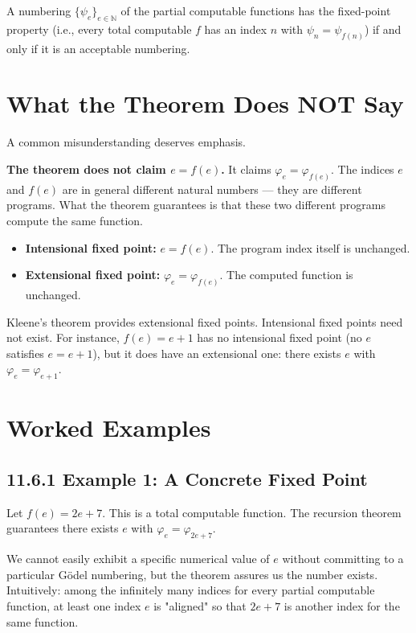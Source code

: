 \begin{theorem}
A numbering $\{ \psi_e\} _{e \in \mathbb{N}}$ of the partial computable functions has the fixed-point property (i.e., every total computable $f$ has an index $n$ with $\psi_n = \psi_{f(n)}$) if and only if it is an acceptable numbering.
\end{theorem}

\section{What the Theorem Does NOT Say}

A common misunderstanding deserves emphasis.

\textbf{The theorem does not claim $e = f(e)$.} It claims $\varphi_e = \varphi_{f(e)}$. The indices $e$ and $f(e)$ are in general different natural numbers --- they are different programs. What the theorem guarantees is that these two different programs compute the same function.

\begin{itemize}
\item \textbf{Intensional fixed point:} $e = f(e)$. The program index itself is unchanged.
\item \textbf{Extensional fixed point:} $\varphi_e = \varphi_{f(e)}$. The computed function is unchanged.
\end{itemize}

Kleene's theorem provides extensional fixed points. Intensional fixed points need not exist. For instance, $f(e) = e + 1$ has no intensional fixed point (no $e$ satisfies $e = e + 1$), but it does have an extensional one: there exists $e$ with $\varphi_e = \varphi_{e+1}$.

\section{Worked Examples}

\subsection{11.6.1 Example 1: A Concrete Fixed Point}

Let $f(e) = 2e + 7$. This is a total computable function. The recursion theorem guarantees there exists $e$ with $\varphi_e = \varphi_{2e+7}$.

We cannot easily exhibit a specific numerical value of $e$ without committing to a particular Gödel numbering, but the theorem assures us the number exists. Intuitively: among the infinitely many indices for every partial computable function, at least one index $e$ is "aligned" so that $2e + 7$ is another index for the same function.

